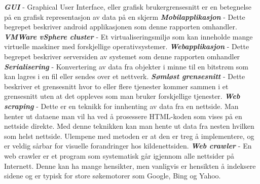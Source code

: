 \documentclass[../main.tex]{subfiles}
\begin{document}
\newline
\textbf{\textit{GUI}} - Graphical User Interface, eller grafisk brukergrensesnitt er en betegnelse på en grafisk representasjon av data på en skjerm\newline
\newline
\textbf{\textit{Mobilapplikasjon}} - Dette begrepet beskriver android applikasjonen som denne rapporten omhandler.\newline
\newline
\textbf{\textit{VMWare vSphere cluster}} - Et virtualiseringsmiljø som kan inneholde mange virtuelle maskiner med forskjellige operativsystemer.  \newline
\newline
\textbf{\textit{Webapplikasjon}} - Dette begrepet beskriver serversiden av systemet som denne rapporten omhandler\newline
\newline
\textbf{\textit{Serialisering}} - Konvertering av data fra objekter i minne til en bitstrøm som kan lagres i en fil eller sendes over et nettverk.  \newline
\newline
\textbf{\textit{Sømløst grensesnitt}} - Dette beskriver et grensesnitt hvor to eller flere tjenester kommer sammen i et grensesnitt uten at det oppleves som man bruker forskjellige tjenester. \newline
\newline
\textbf{\textit{Web scraping}} - Dette er en teknikk for innhenting av data fra en nettside. Man henter ut dataene man vil ha ved å prosessere HTML-koden som vises på en nettside direkte. Med denne teknikken kan man hente ut data fra nesten hvilken som helst nettside. Ulempene med metoden er at den er treg å implementere, og er veldig sårbar for visuelle forandringer hos kildenettsiden.  \newline
\newline
\textbf{\textit{Web crawler}} - En web crawler er et program som systematisk går igjennom alle nettsider på Internett. Denne kan ha mange hensikter, men vanligvis er hensikten å indeksere sidene og er typisk for store søkemotorer som Google, Bing og Yahoo.  \newline
\newline
\end{document}
